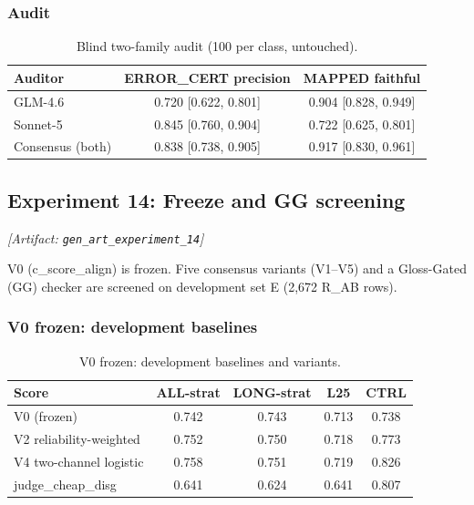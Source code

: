 \documentclass[11pt,letterpaper]{article}
\begin{document}
\subsubsection{Audit}

\begin{table}[!htbp]
\centering
\caption{Blind two-family audit (100 per class, untouched).}
\label{tab:rcomp_audit}
\begin{tabular}{lcc}
\toprule
Auditor & ERROR\_CERT precision & MAPPED faithful \\
\midrule
GLM-4.6 & 0.720 [0.622, 0.801] & 0.904 [0.828, 0.949] \\
Sonnet-5 & 0.845 [0.760, 0.904] & 0.722 [0.625, 0.801] \\
Consensus (both) & 0.838 [0.738, 0.905] & 0.917 [0.830, 0.961] \\
\bottomrule
\end{tabular}
\end{table}

\subsection{Experiment 14: Freeze and GG screening}
\label{sec:exp14}
\noindent\textit{[Artifact: \texttt{gen\_art\_experiment\_14}]}

V0 (c\_score\_align) is frozen. Five consensus variants (V1--V5) and a Gloss-Gated (GG) checker are screened on development set E (2,672 R\_AB rows).

\subsubsection{V0 frozen: development baselines}

\begin{table}[!htbp]
\centering
\caption{V0 frozen: development baselines and variants.}
\label{tab:v0_frozen}
\begin{tabular}{lcccc}
\toprule
Score & ALL-strat & LONG-strat & L25 & CTRL \\
\midrule
V0 (frozen) & 0.742 & 0.743 & 0.713 & 0.738 \\
V2 reliability-weighted & 0.752 & 0.750 & 0.718 & 0.773 \\
V4 two-channel logistic & 0.758 & 0.751 & 0.719 & 0.826 \\
judge\_cheap\_disg & 0.641 & 0.624 & 0.641 & 0.807 \\
\bottomrule
\end{tabular}
\end{table}
\end{document}
